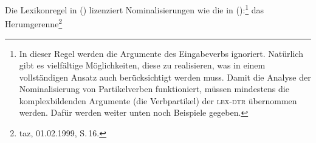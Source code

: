 
\begin{comment}
As is clear from looking at the examples discussed
in the data section, there are various ways in which
the arguments of a verb can be realized after nominalization has been applied.
The subject or object of the verb can be realized as a \emph{von}"=PP (\mex{1}a), as a postnominal
genitive NP (\mex{1}b), or it may be left implicit (\mex{1}c).
\eal
\ex\iw{Angebrülle}
das Angebrülle von Norbert\footnote{
        taz, 15.10.1993, S.\,16.%
}
\ex\iw{Rumgeheule}
das Rumgeheule der FDP\footnote{
        taz, 07.01.1998, S.\,3.%
}
\ex\iw{Herumgerenne}
das Herumgerenne\footnote{
        taz, 01.02.1999, S.\,16.%
}
\label{ex-herumgerenne-zwei}
\zl
Rather than giving a detailed account of the various ways in which arguments
can be realized, I will consider the case where all arguments are suppressed.
The main purpose of this subsection is not to provide all the details of argument realizations
in nominal environments, but rather to show how \geens can be accounted
for without any bracketing paradox.
\end{comment}

Die
Lexikonregel in () lizenziert Nominalisierungen
wie die in ():\footnote{
  In dieser Regel werden die Argumente des Eingabeverbs ignoriert. Natürlich
  gibt es vielfältige Möglichkeiten, diese zu realisieren, was in einem vollständigen
  Ansatz auch berücksichtigt werden muss. Damit die Analyse der Nominalisierung von Partikelverben
  funktioniert, müssen mindestens die komplexbildenden Argumente (die Verbpartikel) der \textsc{lex-dtr} übernommen werden. Dafür werden weiter unten noch Beispiele gegeben.%
}
\ea
das Herumgerenne\footnote{
        taz, 01.02.1999, S.\,16.%
}
\label{ex-herumgerenne-zwei}
\z

